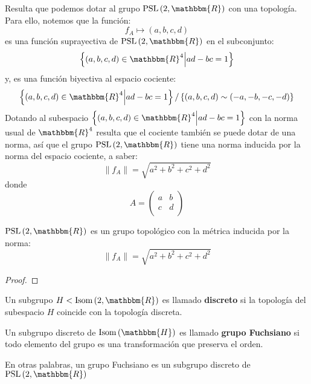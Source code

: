 \documentclass[12pt]{report}
\theoremstyle{largebreak}
\newcommand{\bbm}[1]{\ensuremath{\mathbbm{#1}}}
\newcommand{\norm}[1]{\|#1\|}
\newcommand{\Isom}[1]{\ensuremath{\textup{Isom}\left(#1\right)}}
\newcommand{\PSL}[1]{\ensuremath{\textup{PSL}\left(#1\right)}}
\begin{document}
    Resulta que podemos dotar al grupo $\PSL{2,\bbm{R}}$ con una topología. Para ello, notemos que la función:
    \begin{equation*}
        f_A\mapsto (a,b,c,d)
    \end{equation*}
    es una función suprayectiva de $\PSL{2,\bbm{R}}$ en el subconjunto:
    \begin{equation*}
        \left\{(a,b,c,d)\in\bbm{R}^4\Big|ad-bc=1 \right\}
    \end{equation*}
    y, es una función biyectiva al espacio cociente:
    \begin{equation*}
        \left\{(a,b,c,d)\in\bbm{R}^4\Big|ad-bc=1 \right\}/\left\{(a,b,c,d)\sim(-a,-b,-c,-d) \right\}
    \end{equation*}
    Dotando al subespacio $\left\{(a,b,c,d)\in\bbm{R}^4\Big|ad-bc=1 \right\}$ con la norma usual de $\bbm{R}^4$ resulta que el cociente también se puede dotar de una norma, así que el grupo $\PSL{2,\bbm{R}}$ tiene una norma inducida por la norma del espacio cociente, a saber:
    \begin{equation*}
        \norm{f_A}=\sqrt{a^2+b^2+c^2+d^2}
    \end{equation*}
    donde
    \begin{equation*}
        A=\left(\begin{array}{cc}
            a & b \\
            c & d \\
        \end{array}\right)
    \end{equation*}

    \begin{propo}
        $\PSL{2,\bbm{R}}$ es un grupo topológico con la métrica inducida por la norma:
        \begin{equation*}
            \norm{f_A}=\sqrt{a^2+b^2+c^2+d^2}
        \end{equation*}
    \end{propo}

    \begin{proof}
    \end{proof}

    \begin{mydef}
        Un subgrupo $H<\Isom{2,\bbm{R}}$ es llamado \textbf{discreto} si la topología del subespacio $H$ coincide con la topología discreta.
    \end{mydef}

    \begin{mydef}
        Un subgrupo discreto de $\Isom{\bbm{H}}$ es llamado \textbf{grupo Fuchsiano} si todo elemento del grupo es una transformación que preserva el orden.

        En otras palabras, un grupo Fuchsiano es un subgrupo discreto de $\PSL{2,\bbm{R}}$
    \end{mydef}
\end{document}
